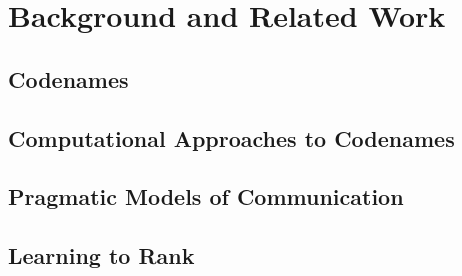 \section{Background and Related Work}\label{sec:background}

\subsection{Codenames}

\subsection{Computational Approaches to Codenames}

\subsection{Pragmatic Models of Communication}

\subsection{Learning to Rank}
